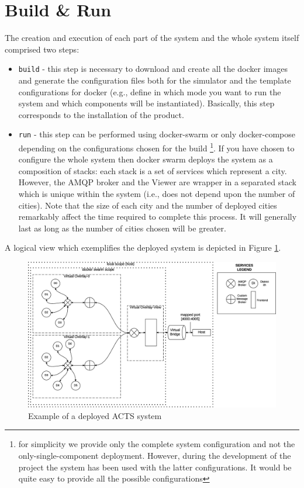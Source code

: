 \section{Build \& Run}
The creation and execution of each part of the system and
the whole system itself comprised two steps:

\begin{itemize}
   \item \texttt{build} - this step is necessary to download and create all the docker
   images and generate the configuration files both for the simulator and the
   template configurations for docker
   (e.g., define in which mode you want to run the system and
   which components will be instantiated). Basically, this step
   corresponds to the installation of the product.
   \item \texttt{run} - this step can be performed using docker-swarm
	or only docker-compose depending on the configurations chosen for the build
	\footnote{for simplicity we provide only the complete system configuration and not the
	only-single-component deployment. However, during the development of the project
	the system has been used with the latter configurations.
	It would be quite easy to provide all the possible configurations}.
	If you have chosen to configure the whole system then docker swarm deploys the system
   as a composition of stacks: each stack is a set of services which represent
   a city. However, the AMQP broker and the Viewer are wrapper in a separated
   stack which is unique within the system (i.e., does not depend upon the
   number of cities). Note that the size of each city and the number of deployed
   cities remarkably affect the time required to complete this process.
	It will generally last as long as the number of cities chosen will be greater.
\end{itemize}

A logical view which exemplifies the deployed system is depicted in Figure
\ref{fig:deploy-sys}.

\begin{figure}[H]
\centering
\includegraphics[scale=0.5,keepaspectratio]{images/user-man/eps/deploy.eps}
\caption{Example of a deployed ACTS system}
\label{fig:deploy-sys}
\end{figure}
